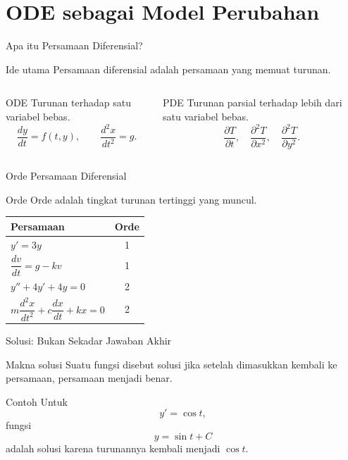 \documentclass[aspectratio=169,11pt]{beamer}
\begin{document}
\section{ODE sebagai Model Perubahan}

\begin{frame}{Apa itu Persamaan Diferensial?}
\begin{block}{Ide utama}
Persamaan diferensial adalah persamaan yang memuat turunan.
\end{block}
\begin{columns}
\begin{block}{ODE}
Turunan terhadap satu variabel bebas.
\[
\frac{dy}{dt}=f(t,y), \qquad \frac{d^2x}{dt^2}=g.
\]
\end{block}
\begin{block}{PDE}
Turunan parsial terhadap lebih dari satu variabel bebas.
\[
\frac{\partial T}{\partial t},\quad
\frac{\partial^2 T}{\partial x^2},\quad
\frac{\partial^2 T}{\partial y^2}.
\]
\end{block}
\end{columns}
\end{frame}

\begin{frame}{Orde Persamaan Diferensial}
\begin{block}{Orde}
Orde adalah tingkat turunan tertinggi yang muncul.
\end{block}
\begin{center}
\begin{tabular}{l c}
\toprule
\textbf{Persamaan} & \textbf{Orde} \\
\midrule
$y' = 3y$ & 1 \\
$\dfrac{dv}{dt}=g-kv$ & 1 \\
$y''+4y'+4y=0$ & 2 \\
$m\dfrac{d^2x}{dt^2}+c\dfrac{dx}{dt}+kx=0$ & 2 \\
\bottomrule
\end{tabular}
\end{center}
\end{frame}

\begin{frame}{Solusi: Bukan Sekadar Jawaban Akhir}
\begin{block}{Makna solusi}
Suatu fungsi disebut solusi jika setelah dimasukkan kembali ke persamaan, persamaan menjadi benar.
\end{block}
\begin{exampleblock}{Contoh}
Untuk
\[
 y'=\cos t,
\]
fungsi
\[
 y=\sin t+C
\]
adalah solusi karena turunannya kembali menjadi $\cos t$.
\end{exampleblock}
\end{frame}
\end{document}
